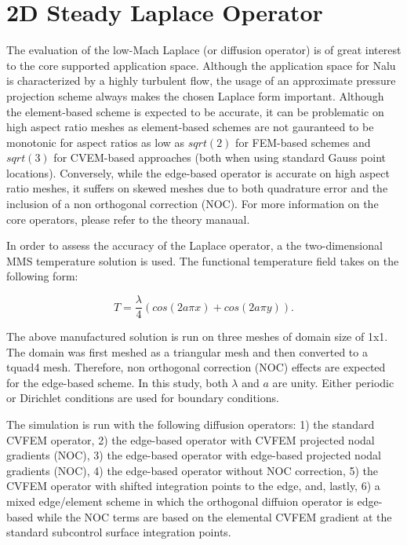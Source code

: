 \section{2D Steady Laplace Operator}
The evaluation of the low-Mach Laplace (or diffusion operator) is of great interest to the core supported application
space. Although the application space for Nalu is characterized by a highly turbulent flow, the usage of an approximate 
pressure projection scheme always makes the chosen Laplace form important. Although the element-based scheme is expected 
to be accurate, it can be problematic on high aspect ratio meshes as element-based schemes are not gauranteed to be monotonic 
for aspect ratios as low as $sqrt(2)$ for FEM-based schemes and $sqrt(3)$ for CVEM-based approaches (both when using standard 
Gauss point locations). Conversely, while the edge-based operator is accurate on high aspect ratio meshes, it suffers on skewed 
meshes due to both quadrature error and the inclusion of a non orthogonal correction (NOC). For more information on the core 
operators, please refer to the theory manaual.

In order to assess the accuracy of the Laplace operator, a the two-dimensional MMS temperature solution 
is used. The functional temperature field takes on the following form:

\begin{equation}
  T = \frac{\lambda}{4} (cos(2 a \pi x) + cos(2 a \pi y)).
\label{advConvTV_u}
\end{equation}

The above manufactured solution is run on three meshes of domain size of 1x1. The domain was first meshed as a triangular mesh and
then converted to a tquad4 mesh. Therefore, non orthogonal correction (NOC) effects are expected for the edge-based scheme. 
In this study, both $\lambda$ and $a$ are unity. Either periodic or Dirichlet conditions are used for boundary conditions. 

The simulation is run with the following diffusion operators: 1) the standard CVFEM operator, 2) the edge-based
operator with CVFEM projected nodal gradients (NOC), 3) the edge-based operator with edge-based projected nodal gradients (NOC),
4) the edge-based operator without NOC correction, 5) the CVFEM operator with shifted integration points to the edge, and, lastly, 
6) a mixed edge/element scheme in which the orthogonal diffuion operator is edge-based while the NOC terms are based on the elemental 
CVFEM gradient at the standard subcontrol surface integration points.

